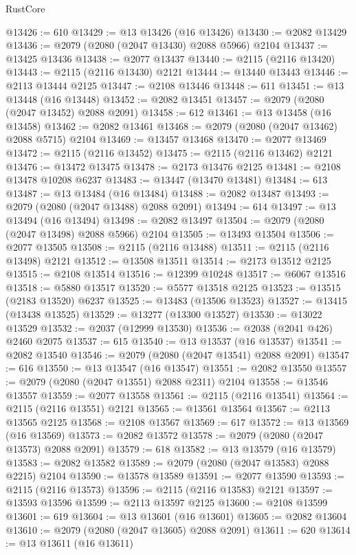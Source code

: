 \begin{lexlean}{RustCore}
\begin{coremodule}
@13426 := 610
@13429 := @13 @13426 (@16 @13426)
@13430 := @2082 @13429
@13436 := @2079 (@2080 (@2047 @13430) @2088 @5966) @2104
@13437 := @13425 @13436
@13438 := @2077 @13437
@13440 := @2115 (@2116 @13420)
@13443 := @2115 (@2116 @13430) @2121
@13444 := @13440 @13443
@13446 := @2113 @13444 @2125
@13447 := @2108 @13446
@13448 := 611
@13451 := @13 @13448 (@16 @13448)
@13452 := @2082 @13451
@13457 := @2079 (@2080 (@2047 @13452) @2088 @2091)
@13458 := 612
@13461 := @13 @13458 (@16 @13458)
@13462 := @2082 @13461
@13468 := @2079 (@2080 (@2047 @13462) @2088 @5715) @2104
@13469 := @13457 @13468
@13470 := @2077 @13469
@13472 := @2115 (@2116 @13452)
@13475 := @2115 (@2116 @13462) @2121
@13476 := @13472 @13475
@13478 := @2173 @13476 @2125
@13481 := @2108 @13478 @10208 @6237
@13483 := @13447 (@13470 @13481)
@13484 := 613
@13487 := @13 @13484 (@16 @13484)
@13488 := @2082 @13487
@13493 := @2079 (@2080 (@2047 @13488) @2088 @2091)
@13494 := 614
@13497 := @13 @13494 (@16 @13494)
@13498 := @2082 @13497
@13504 := @2079 (@2080 (@2047 @13498) @2088 @5966) @2104
@13505 := @13493 @13504
@13506 := @2077 @13505
@13508 := @2115 (@2116 @13488)
@13511 := @2115 (@2116 @13498) @2121
@13512 := @13508 @13511
@13514 := @2173 @13512 @2125
@13515 := @2108 @13514
@13516 := @12399 @10248
@13517 := @6067 @13516
@13518 := @5880 @13517
@13520 := @5577 @13518 @2125
@13523 := @13515 (@2183 @13520) @6237
@13525 := @13483 (@13506 @13523)
@13527 := @13415 (@13438 @13525)
@13529 := @13277 (@13300 @13527)
@13530 := @13022 @13529
@13532 := @2037 (@12999 @13530)
@13536 := @2038 (@2041 @426) @2460 @2075
@13537 := 615
@13540 := @13 @13537 (@16 @13537)
@13541 := @2082 @13540
@13546 := @2079 (@2080 (@2047 @13541) @2088 @2091)
@13547 := 616
@13550 := @13 @13547 (@16 @13547)
@13551 := @2082 @13550
@13557 := @2079 (@2080 (@2047 @13551) @2088 @2311) @2104
@13558 := @13546 @13557
@13559 := @2077 @13558
@13561 := @2115 (@2116 @13541)
@13564 := @2115 (@2116 @13551) @2121
@13565 := @13561 @13564
@13567 := @2113 @13565 @2125
@13568 := @2108 @13567
@13569 := 617
@13572 := @13 @13569 (@16 @13569)
@13573 := @2082 @13572
@13578 := @2079 (@2080 (@2047 @13573) @2088 @2091)
@13579 := 618
@13582 := @13 @13579 (@16 @13579)
@13583 := @2082 @13582
@13589 := @2079 (@2080 (@2047 @13583) @2088 @2215) @2104
@13590 := @13578 @13589
@13591 := @2077 @13590
@13593 := @2115 (@2116 @13573)
@13596 := @2115 (@2116 @13583) @2121
@13597 := @13593 @13596
@13599 := @2113 @13597 @2125
@13600 := @2108 @13599
@13601 := 619
@13604 := @13 @13601 (@16 @13601)
@13605 := @2082 @13604
@13610 := @2079 (@2080 (@2047 @13605) @2088 @2091)
@13611 := 620
@13614 := @13 @13611 (@16 @13611)

\end{coremodule}
\end{lexlean}

